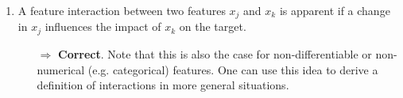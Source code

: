 \begin{enumerate}
\begin{itemize}
        \end{itemize}
    	\item A feature interaction between two features $x_j$ and $x_k$ is apparent if a change in $x_j$ influences the impact of $x_k$ on the target.
    	\begin{itemize}
    		\item[$\Rightarrow$] \textbf{Correct}. Note that this is also the case for non-differentiable or non-numerical (e.g. categorical) features. One can use this idea to derive a definition of interactions in more general situations.
    	\end{itemize}
	\end{enumerate}
